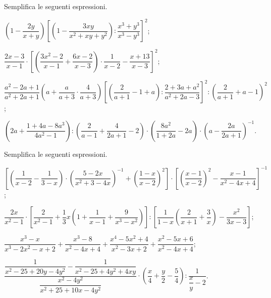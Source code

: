 \begin{esercizio}[\Ast]
\label{ese:14.63}
Semplifica le seguenti espressioni.
\begin{enumeratea}
 \item $\left(1-\dfrac{2y}{x+y}\right)\left[\left(1-\dfrac{3xy}{x^{2}+xy+y^{2}}\right):\dfrac{x^{3}+y^{3}}{x^{3}-y^{3}}\right]^{2}$;
 \item $\dfrac{2x-3}{x-1}\cdot \left[\left(\dfrac{3x^{2}-2}{x-1}+\dfrac{6x-2}{x-3}\right)\cdot {\dfrac{1}{x-2}}-\dfrac{x+13}{x-3}\right]^{2}$;
 \item $\dfrac{a^{2}-2a+1}{a^{2}+2a+1}\left(a+\dfrac{a}{a+3}\cdot {\dfrac{4}{a+3}}\right)\left[\left(\dfrac{2}{a+1}-1+a\right):\dfrac{2+3a+a^{2}}{a^{2}+2a-3}\right]^{2}:\left(\dfrac{2}{a+1}+a-1\right)^{2}$;
 \item $\left(2a+\dfrac{1+4a-8a^{3}}{4a^{2}-1}\right):\left(\dfrac{2}{a-1}+\dfrac{4}{2a+1}-2\right)\cdot \left(\dfrac{8a^{2}}{1+2a}-2a\right)\cdot \left(a-\dfrac{2a}{2a+1}\right)^{-1}$.
\end{enumeratea}
\end{esercizio}
\pagebreak
\begin{esercizio}[\Ast]
\label{ese:14.64}
Semplifica le seguenti espressioni.
\begin{enumeratea}
 \item $\left[\left(\dfrac{1}{x-2}-\dfrac{1}{3-x}\right)\cdot \left(\dfrac{5-2x}{x^{2}+3-4x}\right)^{-1}+\left(\dfrac{1-x}{x-2}\right)^{2}\right]\cdot \left[\left(\dfrac{x-1}{x-2}\right)^{2}-\dfrac{x-1}{x^{2}-4x+4}\right]^{-1}$;
 \item $\dfrac{2x}{x^{2}-1}\cdot \left[\dfrac{2}{x^{2}-1}+\dfrac{1}{3}x\left(1+\dfrac{1}{x-1}+\dfrac{9}{x^{3}-x^{2}}\right)\right]:\left[\dfrac{1}{1-x}\left(\dfrac{2}{x+1}+\dfrac{3}{x}\right)-\dfrac{x^{2}}{3x-3}\right]$;
 \item $\dfrac{x^{3}-x}{x^{3}-2x^{2}-x+2}+\dfrac{x^{3}-8}{x^{2}-4x+4}+\dfrac{x^{4}-5x^{2}+4}{x^{2}-3x+2}+\dfrac{x^{2}-5x+6}{x^{2}-4x+4}$;
 \item $\dfrac{\dfrac{1}{x^{2}-25+20y-4y^{2}}-\dfrac{1}{x^{2}-25+4y^{2}+4xy}}{\dfrac{x^{2}-4y^{2}}{x^{2}+25+10x-4y^{2}}}\cdot \left(\dfrac{x}{4}+\dfrac{y}{2}-\dfrac{5}{4}\right):\dfrac{1}{\dfrac{x}{y}-2}$.
\end{enumeratea}
\end{esercizio}

